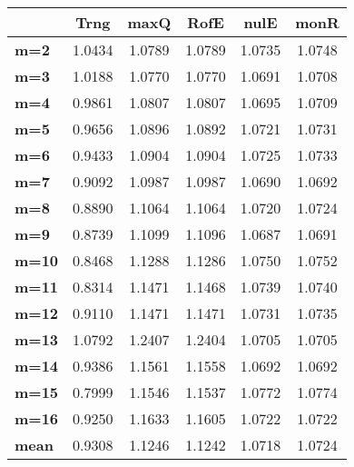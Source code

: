 \begin{tabular}{|l|c|c|c|c|c|}
\hline
&\textbf{Trng}&\textbf{maxQ}&\textbf{RofE}&\textbf{nulE}&\textbf{monR}\\\hline
\textbf{m=2}&1.0434&1.0789&1.0789&1.0735&1.0748\\\hline
\textbf{m=3}&1.0188&1.0770&1.0770&1.0691&1.0708\\\hline
\textbf{m=4}&0.9861&1.0807&1.0807&1.0695&1.0709\\\hline
\textbf{m=5}&0.9656&1.0896&1.0892&1.0721&1.0731\\\hline
\textbf{m=6}&0.9433&1.0904&1.0904&1.0725&1.0733\\\hline
\textbf{m=7}&0.9092&1.0987&1.0987&1.0690&1.0692\\\hline
\textbf{m=8}&0.8890&1.1064&1.1064&1.0720&1.0724\\\hline
\textbf{m=9}&0.8739&1.1099&1.1096&1.0687&1.0691\\\hline
\textbf{m=10}&0.8468&1.1288&1.1286&1.0750&1.0752\\\hline
\textbf{m=11}&0.8314&1.1471&1.1468&1.0739&1.0740\\\hline
\textbf{m=12}&0.9110&1.1471&1.1471&1.0731&1.0735\\\hline
\textbf{m=13}&1.0792&1.2407&1.2404&1.0705&1.0705\\\hline
\textbf{m=14}&0.9386&1.1561&1.1558&1.0692&1.0692\\\hline
\textbf{m=15}&0.7999&1.1546&1.1537&1.0772&1.0774\\\hline
\textbf{m=16}&0.9250&1.1633&1.1605&1.0722&1.0722\\\hline
\textbf{mean}&0.9308&1.1246&1.1242&1.0718&1.0724\\\hline
\end{tabular}
